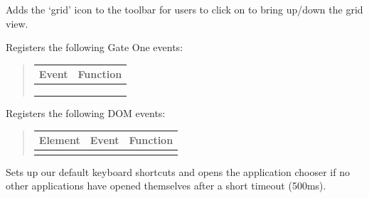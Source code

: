 \documentclass[letterpaper,10pt,openany]{sphinxmanual}
\begin{document}
\begin{fulllineitems}
\begin{fulllineitems}
\begin{fulllineitems}
\begin{quote}
\end{quote}

\end{fulllineitems}



\begin{fulllineitems}
\label{Developer/js_gateone:GateOne.Visual.init}
Adds the `grid' icon to the toolbar for users to click on to bring up/down the grid view.

Registers the following Gate One events:
\begin{quote}

\begin{tabulary}{\linewidth}{|L|L|}
\hline
\textsf{\relax 
Event
} & \textsf{\relax 
Function
}\\
\hline
{}
 & 
{\hyperref[Developer/js_gateone:GateOne.Visual.slideToWorkspace]{}}
\\
\hline
{}
 & 
{\hyperref[Developer/js_gateone:GateOne.Visual.locationsCheck]{}}
\\
\hline
{}
 & 
{\hyperref[Developer/js_gateone:GateOne.Visual.cleanupWorkspaces]{}}
\\
\hline\end{tabulary}

\end{quote}

Registers the following DOM events:
\begin{quote}

\begin{tabulary}{\linewidth}{|L|L|L|}
\hline
\textsf{\relax 
Element
} & \textsf{\relax 
Event
} & \textsf{\relax 
Function
}\\
\hline
{}
 & 
 & 
{\hyperref[Developer/js_gateone:GateOne.Visual.updateDimensions]{}}
\\
\hline\end{tabulary}

\end{quote}

\end{fulllineitems}



\begin{fulllineitems}
\label{Developer/js_gateone:GateOne.Visual.postInit}
Sets up our default keyboard shortcuts and opens the application chooser if no other applications have opened themselves after a short timeout (500ms).


\end{fulllineitems}
\end{fulllineitems}
\end{fulllineitems}
\end{document}
